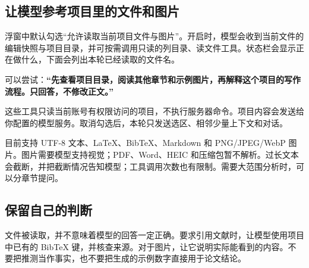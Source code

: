 \subsection{让模型参考项目里的文件和图片}
浮窗中默认勾选“允许读取当前项目文件与图片”。开启时，模型会收到当前文件的编辑快照与项目目录，并可按需调用只读的列目录、读文件工具。状态栏会显示正在做什么，下面会列出本轮已经读取的文件名。

可以尝试：\textbf{“先查看项目目录，阅读其他章节和示例图片，再解释这个项目的写作流程。只回答，不修改正文。”}

这些工具只读当前账号有权限访问的项目，不执行服务器命令。项目内容会发送给你配置的模型服务。取消勾选后，本轮只发送选区、相邻少量上下文和对话。

目前支持 UTF-8 文本、LaTeX、BibTeX、Markdown 和 PNG/JPEG/WebP 图片。图片需要模型支持视觉；PDF、Word、HEIC 和压缩包暂不解析。过长文本会截断，并把截断情况告知模型；工具调用次数也有限制。需要大范围分析时，可以分章节提问。

\subsection{保留自己的判断}
文件被读取，并不意味着模型的回答一定正确。要求引用文献时，让模型使用项目中已有的 BibTeX 键，并核查来源。对于图片，让它说明实际能看到的内容。不要把推测当作事实，也不要把生成的示例数字直接用于论文结论。
